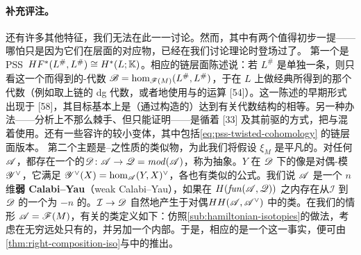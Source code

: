 \paragraph{补充评注。}\label{sub:additional-remarks}
\trFukayaCategory{}还有许多其他特征，我们无法在此一一讨论。然而，其中有两个值得初步一提——哪怕只是因为它们在\trCohomology{}层面的对应物，已经在我们讨论\trFloer{}理论时登场过了。
第一个是 PSS~\trIsomorphism{}$HF^*(L^{\#},L^{\#})\cong H^*(L;\mathbb{K})$。相应的链层面陈述说：若 $L^{\#}$ 是单独一条\trExactLagrangianBrane，则只看这一个\trObject{}而得到的\trAinfty-代数 $\mathscr{B}=\hom_{\mathscr{F}(M)}(L^{\#},L^{\#})$，\trQuasiisomorphic{}于在 $L$ 上做经典\trTopology{}所得到的那个代数（例如取\trSingular{}上链的 dg 代数，或者\trEquivalence{}地使用\trMorseHomology{}与\trFukaya{}的\trGradient\trTree{}运算 [54]）。这一陈述的早期形式出现于 [58]，其目标基本上是（通过构造\trModuliSpace{}的\trIsomorphism）达到有关代数结构的相等。另一种办法——分析上不那么棘手、但只能证明\trQuasiisomorphism——是循着 [33] 及其前驱的方式，把\trPseudoholomorphic\trPolygon{}与\trGradient\trTree{}混着使用。还有一些容许\trTwisted\trCoefficients{}的较小变体，其中包括\eqref{eq:pss-twisted-cohomology} 的链层面版本。
第二个主题是\trDonaldson--\trFukayaCategory{}之\trFrobenius{}性质的类似物，为此我们将假设 $\xi_M$ 是平凡的。对任何\trACategory{}$\mathscr{A}$，都存在一个\trCanonical{}的\trAFunctor{}$\mathscr{D}\colon\mathscr{A}\to\mathscr{Q}=\mathit{mod}(\mathscr{A})$，称为抽象\trSerre{}\trFunctor。\trObject{}$Y$ 在 $\mathscr{D}$ 下的像是对偶\trAinfty-模 $\mathscr{Y}^{\vee}$，它满足 $\mathscr{Y}^{\vee}(X)=\hom_{\mathscr{A}}(Y,X)^{\vee}$，各\trStructureMap{}也有类似的公式。我们说 $\mathscr{A}$ 是一个 $n$ 维\textbf{弱 Calabi--Yau}（weak Calabi--Yau）\trCategory，如果在 $H(\mathit{fun}(\mathscr{A},\mathscr{Q}))$ 之内存在从\trYonedaEmbedding{}$\mathcal{I}$ 到 $\mathscr{D}$ 的一个\trDegree{}为 $-n$ 的\trIsomorphism。\trNaturalTransformation{}$\mathcal{I}\to\mathscr{D}$ 自然地产生于对偶\trHochschildCohomology{}$HH(\mathscr{A},\mathscr{A}^{\vee})$ 中的类。在我们的情形 $\mathscr{A}=\mathscr{F}(M)$，有关的类定义如下：仿照\cref{sub:hamiltonian-isotopies}的做法，考虑在无穷远处只有\trOutgoingPoint{}的\trPointedDisc，并另加一个内部\trMarkedPoint。于是，相应的\trNaturalTransformation{}是一个\trIsomorphism{}这一事实，便可由\cref{thm:right-composition-iso}与\trFloerCohomology{}中的\trPoincareDuality{}推出。
